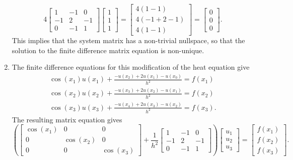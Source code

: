 \begin{enumerate}
\[
4\left[\begin{array}{ccc}
              1 & -1&0 \\
               -1 & 2 &  -1  \\
                 0 &   -1  & 1 
               \end{array}\right]
               \left[\begin{array}{c}
               1\\1\\1
               \end{array}\right]=
                                  \left[\begin{array}{c}
               4(1 - 1)\\ 4(-1 + 2 -1) \\ 4(1-1)
               \end{array}\right] = 
                                  \left[\begin{array}{c}
0\\0\\0
               \end{array}\right].
\]
This implies that the system matrix has a non-trivial nullspace, so that the solution to the finite difference matrix equation is non-unique.
\item The finite difference equations for this modification of the heat equation give
\begin{eqnarray*}
\cos(x_1) u(x_1) + \frac{-u(x_{2}) + 2u(x_1) - u(x_{0})}{h^2} =  f(x_1)\\
\cos(x_2) u(x_2) +\frac{-u(x_{3}) + 2u(x_2) - u(x_{1})}{h^2} =  f(x_2)\\
\cos(x_3) u(x_3) +\frac{-u(x_{4}) + 2u(x_3) - u(x_{2})}{h^2} =  f(x_3).
\end{eqnarray*}
The resulting matrix equation gives
\[
\left(\left[\begin{array}{ccc}
              \cos(x_1) &0 & 0 \\
               0 & \cos(x_2) &  0  \\
                 0 &   0  & \cos(x_3) 
               \end{array}\right] + \frac{1}{h^2}\left[\begin{array}{ccc}
              1 & -1&0 \\
               -1 & 2 &  -1  \\
                 0 &   -1  & 1 
               \end{array}\right]\right)
               \left[\begin{array}{c}
               u_1\\u_2\\u_3
               \end{array}\right] = 
                              \left[\begin{array}{c}
               f(x_1)\\f(x_2)\\f(x_3) 
               \end{array}\right].
\]

\end{enumerate}
